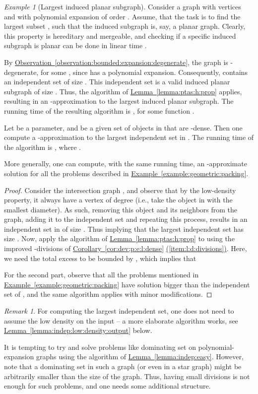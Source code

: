 \documentclass[12pt]{article}
\theoremstyle{remark}\theoremheaderfont{\sf}\theorembodyfont{\upshape}
\newtheorem*{remark:unnumbered}[theorem]{Remark}\newtheorem{remark}[theorem]{Remark}\newtheorem{example}[theorem]{Example}
\numberwithin{figure}{section}\numberwithin{table}{section}\numberwithin{equation}{section}
\newcommand{\HLinkSuffix}[3]{\hyperref[#2]{#1\ref*{#2}{#3}}}
\newcommand{\HLinkShort}[2]{\hyperref[#2]{#1\ref*{#2}}}
\newcommand{\HLink}[2]{\hyperref[#2]{#1~\ref*{#2}}}
\newcommand{\HLinkPage}[2]{\hyperref[#2]{#1~\ref*{#2}}}
\newcommand{\corref}[1]{\HLink{Corollary}{cor:#1}}\newcommand{\correfshort}[1]{\HLinkShort{C}{cor:#1}}\newcommand{\correfpage}[1]{\HLinkPage{Corollary}{cor:#1}}
\newcommand{\exmref}[1]{\HLink{Example}{example:#1}}
\newcommand{\lemlab}[1]{\label{lemma:#1}}
\newcommand{\lemref}[1]{\HLink{Lemma}{lemma:#1}}
\newcommand{\itemref}[1]{\HLinkSuffix{(}{item:#1}{)}}
\newcommand{\obsref}[1]{\HLink{Observation}{observation:#1}}
\begin{document}
\begin{example}[Largest induced planar subgraph]
  Consider a graph  with  vertices and with polynomial
  expansion of order . Assume, that the task is to find the largest
  subset , such that the induced subgraph
   is, say, a planar graph.  Clearly, this property
  is hereditary and mergeable, and checking if a specific induced
  subgraph is planar can be done in linear time \cite{ht-ept-74}.

  By \obsref{bounded:expansion:degenerate}, the graph  is
  -degenerate, for some , since  has a polynomial
  expansion.  Consequently,  contains an independent set of
  size . This independent set is a valid
  induced planar subgraph of size .  Thus, the algorithm
  of \lemref{ptas:h:prop} applies, resulting in an
  -approximation to the largest induced planar subgraph. The
  running time of the resulting algorithm is
  , for some function .\end{example}

\begin{lemma}
  \lemlab{indep:easy}Let  be a parameter, and  be a given set of 
  objects in  that are -dense. Then one compute a
  -approximation to the largest independent set in
  . The running time of the algorithm is
  , where
  .

  More generally, one can compute, with the same running time, an
  -approximate solution for all the problems described in
  \exmref{geometric:packing}.
\end{lemma}
\begin{proof}
  Consider the intersection graph , and
  observe that by the low-density property, it always have a vertex of
  degree  (i.e., take the object in  with the
  smallest diameter). As such, removing this object and its neighbors
  from the graph, adding it to the independent set and repeating this
  process, results in an independent set in  of size
  . Thus implying that the largest independent set has
  size .  Now, apply the algorithm of \lemref{ptas:h:prop}
  to  using the improved -divisions of
  \corref{dev;p:e:l:dense} \itemref{l:d:divisions}.  Here, we need the
  total excess to be bounded by , which implies
  that
  

  For the second part, observe that all the problems mentioned in
  \exmref{geometric:packing} have solution bigger than the independent
  set of , and the same algorithm applies with minor
  modifications.
\end{proof}

\begin{remark:unnumbered}
  For computing the largest independent set, one does not need to
  assume the low density on the input -- a more elaborate algorithm
  works, see \lemref{indep:low:density:output} below.

  It is tempting to try and solve problems like dominating set on
  polynomial-expansion graphs using the algorithm of
  \lemref{indep:easy}.  However, note that a dominating set in such a
  graph (or even in a star graph) might be arbitrarily smaller than
  the size of the graph. Thus, having small divisions is not enough
  for such problems, and one needs some additional structure.
\end{remark:unnumbered}
\end{document}
